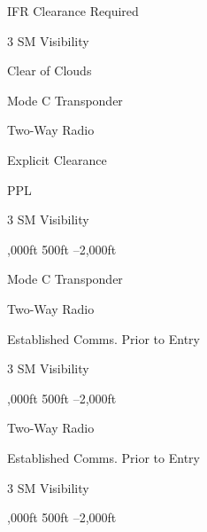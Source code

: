 \documentclass{article}
\begin{document}
\begin{multicols*}{2}


    \begin{notelist}
      \item IFR Clearance Required
    \end{notelist}


    \begin{notelist}
      \item 3 SM Visibility
      \item Clear of Clouds
      \item Mode C Transponder
      \item Two-Way Radio
      \item Explicit Clearance
      \item PPL
    \end{notelist}


    \begin{notelist}
      \item 3 SM Visibility
      \item {},000ft \textdownarrow 500ft --2,000ft
      \item Mode C Transponder
      \item Two-Way Radio
      \item Established Comms. Prior to Entry
    \end{notelist}

    \columnbreak


    \begin{notelist}
      \item 3 SM Visibility
      \item {},000ft \textdownarrow 500ft --2,000ft
      \item Two-Way Radio
      \item Established Comms. Prior to Entry
    \end{notelist}



    \begin{notelist}
      \item 3 SM Visibility
      \item {},000ft \textdownarrow 500ft --2,000ft
    \end{notelist}


\end{multicols*}
\end{document}
